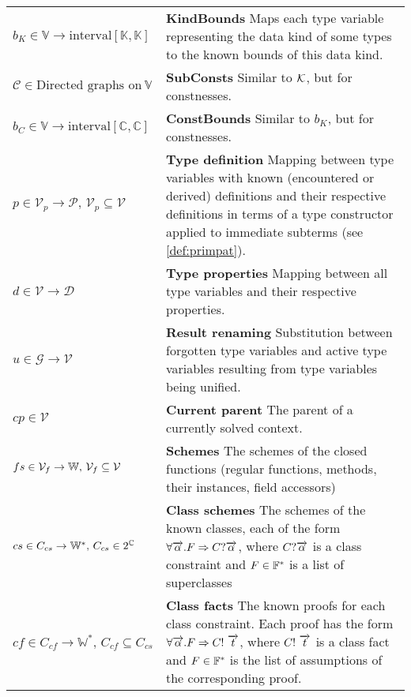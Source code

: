 \begin{table}
\begin{tabular}{p{.23\linewidth}p{.7\linewidth}}
  $b_K \in \mathbb{V} \to \text{interval} \left[\mathbb{K}, \mathbb{K}\right]$ & \textbf{KindBounds}\quad
  Maps each type variable representing the data kind of some types to the known bounds of this data kind. \\

  $\mathcal{C} \in \text{Directed graphs on}\ \mathbb{V}$ & \textbf{SubConsts}\quad
  Similar to $\mathcal{K}$, but for constnesses. \\

  $b_C \in \mathbb{V} \to \text{interval} \left[\mathbb{C}, \mathbb{C}\right]$ & \textbf{ConstBounds}\quad
  Similar to $b_K$, but for constnesses. \\

  $p \in \mathcal{V}_p \to \mathcal{P},\,\mathcal{V}_p \subseteq \mathcal{V}$ & \textbf{Type definition}\quad
  Mapping between type variables with known (encountered or derived) definitions and their respective definitions in terms of a type constructor applied to immediate subterms (see \cref{def:primpat}). \\

  $d \in \mathcal{V} \to \mathcal{D}$ & \textbf{Type properties}\quad
  Mapping between all type variables and their respective properties. \\

  $u \in \mathcal{G} \to \mathcal{V}$ & \textbf{Result renaming}\quad
  Substitution between forgotten type variables and active type variables resulting from type variables being unified. \\

  $cp \in \mathcal{V}$ & \textbf{Current parent}\quad
  The parent of a currently solved context. \\

  $fs \in \mathcal{V}_f \to \mathbb{W},\,\mathcal V_f \subseteq \mathcal V$ & \textbf{Schemes}\quad
  The schemes of the closed functions (regular functions, methods, their instances, field accessors) \\

  $cs \in C_{cs} \to \mathbb{W}^\ast,\,C_{cs} \in 2^{\mathbb{C}}$ & \textbf{Class schemes}\quad
  The schemes of the known classes, each of the form $\forall \overrightarrow{\alpha} . F \Rightarrow C?  \overrightarrow{\alpha}$, where $C?  \overrightarrow{\alpha}$ is a class constraint and $F \in {\mathbb{F}}^\ast$ is a list of superclasses \\

  $cf \in C_{cf} \to \mathbb{W}^\ast,\,C_{cf} \subseteq C_{cs}$ & \textbf{Class facts}\quad
  The known proofs for each class constraint. Each proof has the form $\forall \overrightarrow{\alpha} . F \Rightarrow C!\ \overrightarrow{t}$, where $C!\ \overrightarrow{t}$ is a class fact and $F \in {\mathbb{F}}^\ast$ is the list of assumptions of the corresponding proof. \\


\end{tabular}
\end{table}
